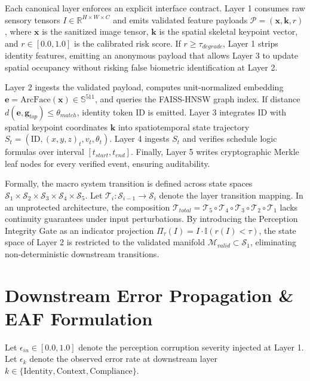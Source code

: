 \documentclass[conference]{IEEEtran}
\begin{document}
Each canonical layer enforces an explicit interface contract. Layer 1 consumes raw sensory tensors $I \in \mathbb{R}^{H \times W \times C}$ and emits validated feature payloads $\mathcal{P} = (\mathbf{x}, \mathbf{k}, r)$, where $\mathbf{x}$ is the sanitized image tensor, $\mathbf{k}$ is the spatial skeletal keypoint vector, and $r \in [0.0, 1.0]$ is the calibrated risk score. If $r \ge \tau_{degrade}$, Layer 1 strips identity features, emitting an anonymous payload that allows Layer 3 to update spatial occupancy without risking false biometric identification at Layer 2.

Layer 2 ingests the validated payload, computes unit-normalized embedding $\mathbf{e} = \text{ArcFace}(\mathbf{x}) \in \mathbb{S}^{511}$, and queries the FAISS-HNSW graph index. If distance $d(\mathbf{e}, \mathbf{g}_{top}) \le \theta_{match}$, identity token $\text{ID}$ is emitted. Layer 3 integrates $\text{ID}$ with spatial keypoint coordinates $\mathbf{k}$ into spatiotemporal state trajectory $S_t = (\text{ID}, (x,y,z)_t, v_t, \theta_t)$. Layer 4 ingests $S_t$ and verifies schedule logic formulas over interval $[t_{start}, t_{end}]$. Finally, Layer 5 writes cryptographic Merkle leaf nodes for every verified event, ensuring auditability.

Formally, the macro system transition is defined across state spaces $\mathcal{S}_1 \times \mathcal{S}_2 \times \mathcal{S}_3 \times \mathcal{S}_4 \times \mathcal{S}_5$. Let $\mathcal{T}_i: \mathcal{S}_{i-1} \to \mathcal{S}_i$ denote the layer transition mapping. In an unprotected architecture, the composition $\mathcal{T}_{total} = \mathcal{T}_5 \circ \mathcal{T}_4 \circ \mathcal{T}_3 \circ \mathcal{T}_2 \circ \mathcal{T}_1$ lacks continuity guarantees under input perturbations. By introducing the Perception Integrity Gate as an indicator projection $\Pi_{\tau}(I) = I \cdot \mathbb{I}(r(I) < \tau)$, the state space of Layer 2 is restricted to the validated manifold $\mathcal{M}_{valid} \subset \mathcal{S}_1$, eliminating non-deterministic downstream transitions.

\section{Downstream Error Propagation & EAF Formulation}
Let $\epsilon_{in} \in [0.0, 1.0]$ denote the perception corruption severity injected at Layer 1. Let $\epsilon_k$ denote the observed error rate at downstream layer $k \in \{\text{Identity}, \text{Context}, \text{Compliance}\}$.
\end{document}

